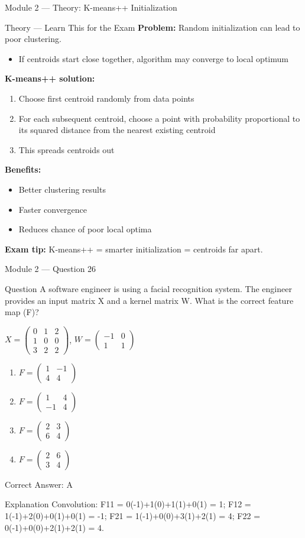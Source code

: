 \documentclass[aspectratio=169,10pt]{beamer}
\newcommand{\question}[1]{%
	\begin{block}{Question}
		#1
	\end{block}
}
\newcommand{\options}[4]{%
	\begin{enumerate}[label=\Alph*.,leftmargin=*]
		\item #1
		\item #2
		\item #3
		\item #4
	\end{enumerate}
}
\newcommand{\answerbox}[1]{%
	\begin{exampleblock}{Correct Answer: #1}
	\end{exampleblock}
}
\newcommand{\explain}[1]{%
	\begin{block}{Explanation}
		\small #1
	\end{block}
}
\newcommand{\theory}[1]{%
	\begin{block}{Theory --- Learn This for the Exam}
		\small #1
	\end{block}
}
\begin{document}
	\begin{frame}{Module 2 --- Theory: K-means++ Initialization}
		\theory{
			\textbf{Problem:} Random initialization can lead to poor clustering.
			\begin{itemize}
				\item If centroids start close together, algorithm may converge to local optimum
			\end{itemize}
			\textbf{K-means++ solution:}
			\begin{enumerate}
				\item Choose first centroid randomly from data points
				\item For each subsequent centroid, choose a point with probability proportional to its squared distance from the nearest existing centroid
				\item This spreads centroids out
			\end{enumerate}
			\textbf{Benefits:}
			\begin{itemize}
				\item Better clustering results
				\item Faster convergence
				\item Reduces chance of poor local optima
			\end{itemize}
			\textbf{Exam tip:} K-means++ = smarter initialization = centroids far apart.
		}
	\end{frame}
	
	\begin{frame}{Module 2 --- Question 26}
		\question{A software engineer is using a facial recognition system. The engineer provides an input matrix X and a kernel matrix W. What is the correct feature map (F)?}
		\begin{center}
			$X = \begin{pmatrix} 0 & 1 & 2 \\ 1 & 0 & 0 \\ 3 & 2 & 2 \end{pmatrix}$,
			$W = \begin{pmatrix} -1 & 0 \\ 1 & 1 \end{pmatrix}$
		\end{center}
		\options{$F = \begin{pmatrix} 1 & -1 \\ 4 & 4 \end{pmatrix}$}{$F = \begin{pmatrix} 1 & 4 \\ -1 & 4 \end{pmatrix}$}{$F = \begin{pmatrix} 2 & 3 \\ 6 & 4 \end{pmatrix}$}{$F = \begin{pmatrix} 2 & 6 \\ 3 & 4 \end{pmatrix}$}
		\answerbox{A}
		\explain{Convolution: F11 = 0(-1)+1(0)+1(1)+0(1) = 1; F12 = 1(-1)+2(0)+0(1)+0(1) = -1; F21 = 1(-1)+0(0)+3(1)+2(1) = 4; F22 = 0(-1)+0(0)+2(1)+2(1) = 4.}
	\end{frame}
	
\end{document}
